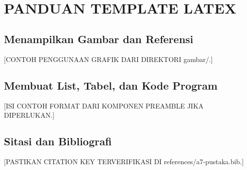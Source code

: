 \chapter[PANDUAN TEMPLATE LATEX]{\\ PANDUAN TEMPLATE LATEX}
\section{Menampilkan Gambar dan Referensi}
[CONTOH PENGGUNAAN GRAFIK DARI DIREKTORI gambar/.]

\section{Membuat List, Tabel, dan Kode Program}
[ISI CONTOH FORMAT DARI KOMPONEN PREAMBLE JIKA DIPERLUKAN.]

\section{Sitasi dan Bibliografi}
[PASTIKAN CITATION KEY TERVERIFIKASI DI references/a7-pustaka.bib.]
